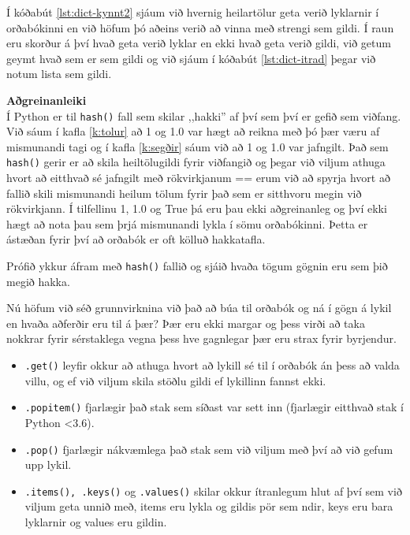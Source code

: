 Í kóðabút \ref{lst:dict-kynnt2} sjáum við hvernig heilartölur geta verið lyklarnir í orðabókinni en við höfum þó aðeins verið að vinna með strengi sem gildi.
Í raun eru skorður á því hvað geta verið lyklar en ekki hvað geta verið gildi, við getum geymt hvað sem er sem gildi og við sjáum í kóðabút \ref{lst:dict-itrad} þegar við notum lista sem gildi.

\begin{itarefni}
\textbf{Aðgreinanleiki}\\
Í Python er til \texttt{hash()} fall sem skilar ,,hakki'' af því sem því er gefið sem viðfang.
Við sáum í kafla \ref{k:tolur} að 1 og 1.0 var hægt að reikna með þó þær væru af mismunandi tagi og í kafla \ref{k:segðir} sáum við að 1 og 1.0 var jafngilt.
Það sem \texttt{hash()} gerir er að skila heiltölugildi fyrir viðfangið og þegar við viljum athuga hvort að eitthvað sé jafngilt með rökvirkjanum == erum við að spyrja hvort að fallið skili mismunandi heilum tölum fyrir það sem er sitthvoru megin við rökvirkjann.
Í tilfellinu 1, 1.0 og True þá eru þau ekki aðgreinanleg og því ekki hægt að nota þau sem þrjá mismunandi lykla í sömu orðabókinni.
Þetta er ástæðan fyrir því að orðabók er oft kölluð hakkatafla.

Prófið ykkur áfram með \texttt{hash()} fallið og sjáið hvaða tögum gögnin eru sem þið megið hakka. 
\end{itarefni}

Nú höfum við séð grunnvirknina við það að búa til orðabók og ná í gögn á lykil en hvaða aðferðir eru til á þær?
Þær eru ekki margar og þess virði að taka nokkrar fyrir sérstaklega vegna þess hve gagnlegar þær eru strax fyrir byrjendur.

\begin{itemize}
\item[] \texttt{.get()} leyfir okkur að athuga hvort að lykill sé til í orðabók án þess að valda villu, og ef við viljum skila stöðlu gildi ef lykillinn fannst ekki.
\item[] \texttt{.popitem()} fjarlægir það stak sem síðast var sett inn (fjarlægir eitthvað stak í Python <3.6).
\item[] \texttt{.pop()} fjarlægir nákvæmlega það stak sem við viljum með því að við gefum upp lykil.
\item[] \texttt{.items(), .keys()} og \texttt{.values()} skilar okkur ítranlegum hlut af því sem við viljum geta unnið með, items eru lykla og gildis pör sem ndir, keys eru bara lyklarnir og values eru gildin.
\end{itemize}

